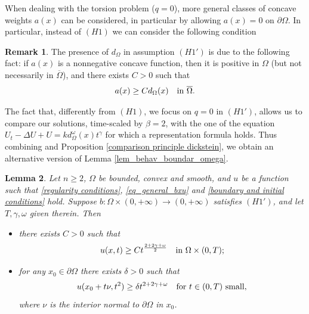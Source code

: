 \documentclass[11pt, reqno]{amsart}
\newtheorem{lemma}{Lemma}[section]
\theoremstyle{definition}
\newtheorem{remark}[lemma]{Remark}
\numberwithin{equation}{section}
\newcommand{\Omegabar}{\overline{\Omega}}
\begin{document}
When dealing with the torsion problem ($q=0$), more general classes of concave weights $a(x)$ can be considered, in particular by allowing $a(x)=0$ on $\partial \Omega$. In particular, instead of \hyperlink{H1}{\((H1) \)} we can consider the following condition

\begin{remark}\label{rem_concav_distance}
The presence of $d_{\Omega}$ in assumption \hyperlink{H1'}{\((H1') \)} is due to the following fact: if $a(x)$ is a nonnegative concave function, then it is positive in $\Omega$ (but not necessarily in $\Omegabar$), and there exists $C>0$ such that
$$a(x) \geq C d_{\Omega}(x) \quad \hbox{in $\Omegabar$}.$$
\end{remark}

The fact that, differently from \hyperlink{H1}{\((H1) \)}, we focus on $q=0$ in \hyperlink{H1'}{\((H1') \)}, allows us to compare our solutions, time-scaled by $\beta=2$, with the one of the equation $ U_t -\Delta U + U = k d_{\Omega}^{\omega}(x) t^{\gamma} $ for which a representation formula holds. 
Thus combining \cite[Lemma 3]{IsSa13} and Proposition \ref{comparison principle dickstein}, we obtain an alternative version of Lemma \ref{lem_behav_boundar_omega}.

\begin{lemma}\label{lem_behav_IshSal}
Let $n\geq 2$, $\Omega$ be bounded, convex and smooth, and $u$ be a function such that \eqref{regularity conditions}, \eqref{eq_general_bxu} and \eqref{boundary and initial conditions} hold.
Suppose $b\colon\Omega\times(0,+\infty)\to (0,+\infty)$ satisfies \hyperlink{H1'}{\( (H1') \)}, and let $T, \gamma, \omega$ given therein. 
Then
\begin{itemize}
\item[(i)] there exists $C>0$ such that
$$u(x,t) \geq C t^{\frac{2+2\gamma+\omega}{2}} \quad \hbox{in $\Omega \times (0,T)$};$$
\item[(ii)] for any $x_0 \in \partial \Omega$ there exists $\delta>0$ such that 
$$u(x_0+t\nu,t^2)\geq \delta t^{2+2\gamma+\omega} \quad \hbox{for $t \in (0,T)$ small},$$
where $\nu$ is the interior normal to $\partial \Omega$ in $x_0$.
\end{itemize}
\end{lemma}
\end{document}
